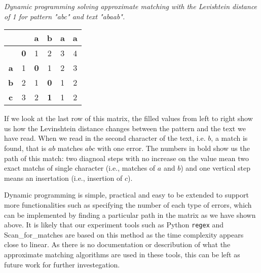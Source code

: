 \begin{example} \emph{Dynamic programming solving approximate matching with the Levishtein distance of 1 for pattern "abc" and text "abaab".}

\begin{table}[H]
	\centering
\begin{tabular}{|c|c|c|c|c|c|}
	\hline
	\multicolumn{1}{|l|}{}            & \multicolumn{1}{l|}{}    & \multicolumn{1}{l|}{\textbf{a}}   & \multicolumn{1}{l|}{\textbf{b}}   & \multicolumn{1}{l|}{\textbf{a}} & \multicolumn{1}{l|}{\textbf{a}} \\ \hline
	& \textbf{0}               & 1                                 & 2                                 & 3                               & 4                               \\ \hline
	\textbf{a}                        & 1                        & {\color[HTML]{000000} \textbf{0}} & 1                                 & {\color[HTML]{333333} 2}        & {\color[HTML]{333333} 3}        \\ \hline
	\textbf{b}                        & 2                        & 1                                 & \textbf{0}                        & {\color[HTML]{333333} 1}        & {\color[HTML]{333333} 2}        \\ \hline
	{\color[HTML]{333333} \textbf{c}} & {\color[HTML]{333333} 3} & {\color[HTML]{333333} 2}          & {\color[HTML]{32CB00} \textbf{1}} & {\color[HTML]{000000} 1}        & {\color[HTML]{333333} 2}        \\ \hline
\end{tabular}
\end{table}
	\label{fig:dynap}
 \end{example}
 
If we look at the last row of this matrix, the filled values from left to right show us how the Levinshtein distance changes between the pattern and the text we have read. When we read in the second character of the text, i.e. $b$, a match is found, that is $ab$ matches $abc$ with one error. The numbers in bold show us the path of this match: two diagnoal steps with no increase on the value mean two exact matchs of single character (i.e., matches of $a$ and $b$) and one vertical step means an insertation (i.e., insertion of $c$). 

Dynamic programming is simple, practical and easy to be extended to support more functionalities such as specifying the number of each type of errors, which can be implemented by finding a particular path in the matrix as we have shown above. It is likely that our experiment tools such as Python {\tt regex} and Scan\_for\_matches are based on this method as the time complexity appears close to linear. As there is no documentation or describution of what the approximate matching algorithms are used in these tools, this can be left as future work for further investegation.

